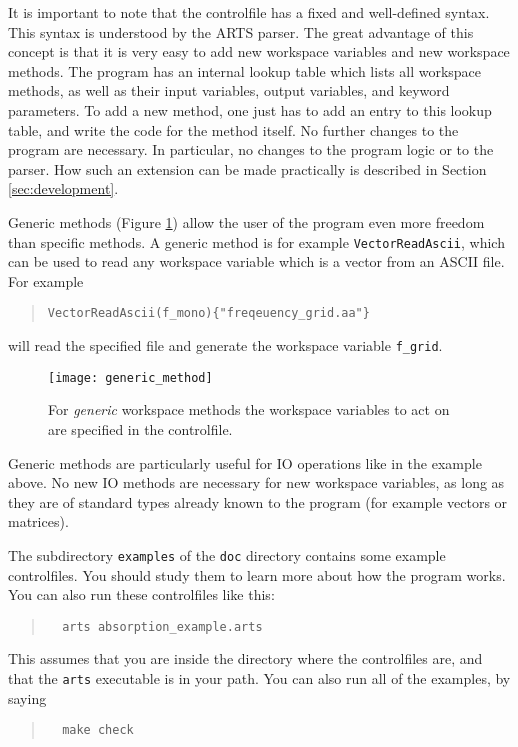 It is important to note that the controlfile has a fixed and
well-defined syntax. This syntax is understood by the ARTS parser.
The great advantage of this concept is that it is very easy to add
new workspace variables and new workspace methods. The program has
an internal lookup table which lists all workspace methods, as well
as their input variables, output variables, and keyword
parameters. To add a new method, one just has to add an entry to
this lookup table, and write the code for the method itself. No
further changes to the program are necessary. In particular, no
changes to the program logic or to the parser. How such an extension
can be made practically is described in Section \ref{sec:development}.


\label{sec:concept:generic}

Generic methods (Figure \ref{fig:generic_method}) allow the user of the
program even more freedom than specific methods. A generic method is
for example \verb|VectorReadAscii|, which can be used to read any
workspace variable which is a vector from an ASCII file. For example
\begin{quote}
  \verb|VectorReadAscii(f_mono){"freqeuency_grid.aa"}|
\end{quote}
will read the specified file and generate the workspace variable
\verb|f_grid|.

\begin{figure}
  \begin{center}
    \texttt{[image: generic\_method]}
    \caption{For \emph{generic}
      workspace methods the workspace variables to act on are
        specified in the controlfile.}
    \label{fig:generic_method}
  \end{center}
\end{figure}

Generic methods are particularly useful for IO operations like in the
example above. No new IO methods are necessary for new workspace
variables, as long as they are of standard types already known to the
program (for example vectors or matrices). 

\label{sec:concept:practical}

The subdirectory \verb|examples| of the \verb|doc| directory contains
some example controlfiles. You should study them to learn more about
how the program works. You can also run these controlfiles like this:
\begin{quote}
\begin{verbatim}
  arts absorption_example.arts
\end{verbatim}
\end{quote}
This assumes that you are inside the directory where the controlfiles
are, and that the \verb|arts| executable is in your path.  You can
also run all of the examples, by saying
\begin{quote}
\begin{verbatim}
  make check
\end{verbatim}
\end{quote}

